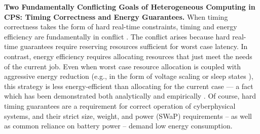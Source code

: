 
\vspace{2mm} \noindent \textbf{Two Fundamentally Conflicting Goals of
Heterogeneous Computing in CPS: Timing Correctness and Energy
Guarantees.} When timing correctness takes the form of hard real-time
constraints, timing and energy efficiency are fundamentally in
conflict \cite{conflict-book}. The conflict arises because hard
real-time guarantees require reserving resources sufficient for worst
case latency.  In contrast, energy efficiency requires allocating
resources that just meet the needs of the current job.  Even when
worst case resource allocation is coupled with aggressive energy
reduction (e.g., in the form of voltage scaling \cite{Dudani2002} or
sleep states \cite{Huang2009}), this strategy is less energy-efficient
than allocating for the current case --- a fact which has been
demonstrated both analytically \cite{Albers2011,Bansal2011,Irani} and
empirically \cite{LeSueur11,HotPower,Imes2014a,PowerSlope}. Of course,
hard timing guarantees are a requirement for correct operation of
cyberphysical systems, and their strict size, weight, and power (SWaP)
requirements -- as well as common reliance on battery power -- demand
low energy consumption.

